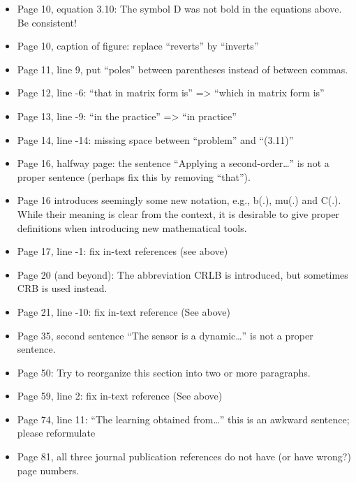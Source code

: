 \documentclass[11pt]{article}
\begin{document}
\begin{itemize}
\begin{itemize}
    \item Page 10, equation 3.10: The symbol D was not bold in the equations above. Be consistent!
    \item Page 10, caption of figure: replace “reverts” by “inverts”
    \item Page 11, line 9, put “poles” between parentheses instead of between commas.
    \item Page 12, line -6: “that in matrix form is” => “which in matrix form is”
    \item Page 13, line -9: “in the practice” => “in practice”
    \item Page 14, line -14: missing space between “problem” and “(3.11)”
    \item Page 16, halfway page: the sentence “Applying a second-order…” is not a proper sentence (perhaps fix this by removing “that”).
    \item Page 16 introduces seemingly some new notation, e.g., b(.), mu(.) and C(.). While their meaning is clear from the context, it is desirable to give proper definitions when introducing new mathematical tools.
    \item Page 17, line -1: fix in-text references (see above)
    \item Page 20 (and beyond): The abbreviation CRLB is introduced, but sometimes CRB is used instead.
    \item Page 21, line -10: fix in-text reference (See above)
    \item Page 35, second sentence “The sensor is a dynamic…” is not a proper sentence.
    \item Page 50: Try to reorganize this section into two or more paragraphs.
    \item Page 59, line 2: fix in-text reference (See above)
    \item Page 74, line 11: “The learning obtained from…” this is an awkward sentence; please reformulate
    \item Page 81, all three journal publication references do not have (or have wrong?) page numbers.
    \end{itemize}
\end{itemize}




\end{document}
